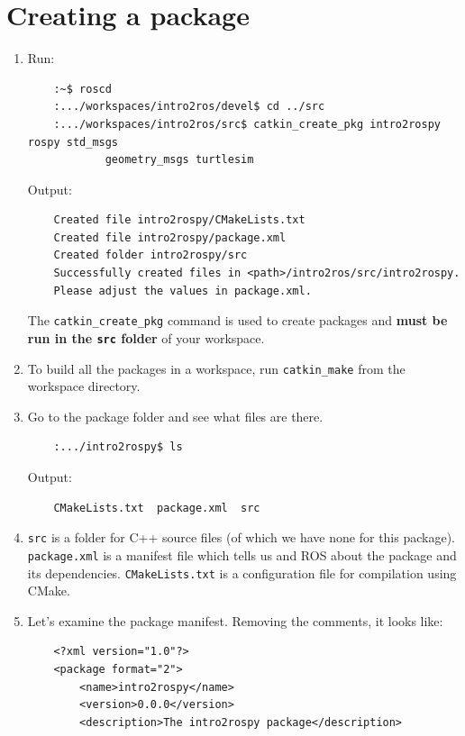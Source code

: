 \documentclass{article}
\begin{document}
    \section{Creating a package}
    \begin{enumerate}
        \item Run:
        \begin{verbatim}
    :~$ roscd
    :.../workspaces/intro2ros/devel$ cd ../src
    :.../workspaces/intro2ros/src$ catkin_create_pkg intro2rospy rospy std_msgs 
            geometry_msgs turtlesim
        \end{verbatim}
        Output:
        \begin{verbatim}
    Created file intro2rospy/CMakeLists.txt
    Created file intro2rospy/package.xml
    Created folder intro2rospy/src
    Successfully created files in <path>/intro2ros/src/intro2rospy.
    Please adjust the values in package.xml.
        \end{verbatim}
        The \texttt{catkin\_create\_pkg} command is used to create packages
        and \textbf{must be run in the \texttt{src} folder} of your workspace.
        \item To build all the packages in a workspace, run \texttt{catkin\_make}
        from the workspace directory.
        \item Go to the package folder and see what files are there.
        \begin{verbatim}
    :.../intro2rospy$ ls
        \end{verbatim}
        Output:
        \begin{verbatim}
    CMakeLists.txt  package.xml  src
        \end{verbatim}
        \item \texttt{src} is a folder for C++ source files (of which we have none for this package).
        \texttt{package.xml} is a manifest file which tells us and ROS about the package and its dependencies.
        \texttt{CMakeLists.txt} is a configuration file for compilation using CMake.
        \item Let's examine the package manifest. Removing the comments, it looks like:
        \begin{verbatim}
    <?xml version="1.0"?>
    <package format="2">
        <name>intro2rospy</name>
        <version>0.0.0</version>
        <description>The intro2rospy package</description>
    

\end{verbatim}
\end{enumerate}
\end{document}

